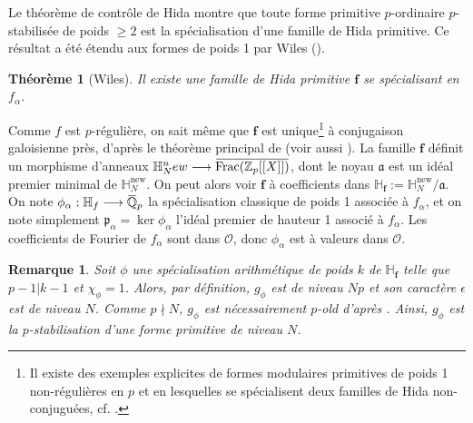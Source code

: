 \documentclass[12pt]{amsart}
\newcommand\bQ{\mathbb{Q}}
\newcommand\bH{\mathbb{H}}
\newcommand\Zp{{\mathbb{Z}_{p}}}
\newcommand\cO{\mathcal{O}}
\newcommand\ga{\mathfrak{a}}
\newcommand\gp{\mathfrak{p}}
\newcommand{\ob}[1]{\mkern 1.5mu\overline{\mkern-1.5mu#1\mkern-1.5mu}\mkern 1.5mu}
\DeclareMathOperator{\Frac}{Frac}
\theoremstyle{defstyle}
\newtheorem{remarque}[subsubsection]{Remarque}
\theoremstyle{thmstyle}
\newtheorem{theorem}[subsubsection]{Théorème}
\begin{document}
Le théorème de contrôle de Hida montre que toute forme primitive $p$-ordinaire $p$-stabilisée de poids $\geq 2$ est la spécialisation d'une famille de Hida primitive. Ce résultat a été étendu aux formes de poids 1 par Wiles (\cite[Theorem 3]{wiles1988ordinary}).

\begin{theorem}[Wiles]
	Il existe une famille de Hida primitive $\textbf{f}$ se spécialisant en $f_\alpha$. 
\end{theorem}

Comme $f$ est $p$-régulière, on sait même que $\textbf{f}$ est unique\footnote{Il existe des exemples explicites de formes modulaires primitives de poids 1 non-régulières en $p$ et en lesquelles se spécialisent deux familles de Hida non-conjuguées, cf. \cite[§7.4]{dimitrovghate}.} à conjugaison galoisienne près, d'après le théorème principal de \cite{bellaiche2016eigencurve} (voir aussi \cite[Corollary 1.15]{dimitrov2014local}). La famille $\textbf{f}$ définit un morphisme d'anneaux $\bH_N^\textrm{new} \longrightarrow \ob{\Frac(\Zp[[X]])}$, dont le noyau $\ga$ est un idéal premier minimal de $\bH_N^\textrm{new}$. On peut alors voir $\textbf{f}$ à coefficients dans $\bH_\textbf{f}:=\bH^\textrm{new}_N/\ga$. On note $\phi_{\alpha} : \bH_\textbf{f} \longrightarrow \ob{\bQ}_p$ la spécialisation classique de poids 1 associée à $f_\alpha$, et on note simplement $\gp_{\alpha}=\ker{\phi_{\alpha}}$ l'idéal premier de hauteur 1 associé à $f_\alpha$. Les coefficients de Fourier de $f_\alpha$ sont dans $\cO$, donc $\phi_{\alpha}$ est à valeurs dans $\cO$.
\begin{remarque}\label{p-old}
	Soit $\phi$ une spécialisation arithmétique de poids $k$ de $\bH_\textbf{f}$ telle que $p-1|k-1$ et $\chi_\phi=1$. Alors, par définition, $g_\phi$ est de niveau $Np$ et son caractère $\epsilon$ est de niveau $N$. Comme $p \nmid N$, $g_\phi$ est nécessairement $p$-old d'après \cite[Theorem 4.6.17/2]{miyake2006modular}. Ainsi, $g_\phi$ est la $p$-stabilisation d'une forme primitive de niveau $N$. 
\end{remarque} 
\end{document}
